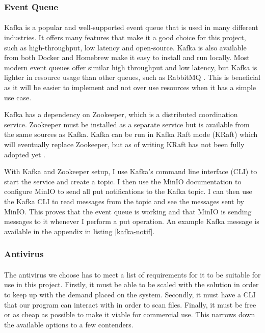 \documentclass[12pt, conference, final, a4paper, onecolumn, compsoc]{IEEEtran}
\begin{document}
\subsubsection*{Event Queue}
\paragraph{}

Kafka is a popular and well-supported event queue that is used in many different
industries. It offers many features that make it a good choice for this project,
such as high-throughput, low latency and open-source. Kafka is also available
from both Docker and Homebrew make it easy to install and run locally. Most
modern event queues offer similar high throughput and low latency, but Kafka is
lighter in resource usage than other queues, such as RabbitMQ
\citep{kafka-rabbitmq}. This is beneficial as it will be easier to implement and
not over use resources when it has a simple use case.

Kafka has a dependency on Zookeeper, which is a distributed coordination
service. Zookeeper must be installed as a separate service but is available from
the same sources as Kafka. Kafka can be run in Kafka Raft mode (KRaft) which
will eventually replace Zookeeper, but as of writing KRaft has not been fully
adopted yet \citep{kafka-raft}.

With Kafka and Zookeeper setup, I use Kafka's command line interface (CLI) to
start the service and create a topic. I then use the MinIO documentation to
configure MinIO to send all put notifications to the Kafka topic. I can then use
the Kafka CLI to read messages from the topic and see the messages sent by
MinIO. This proves that the event queue is working and that MinIO is sending
messages to it whenever I perform a put operation. An example Kafka message is
available in the appendix in listing \ref{kafka-notif}.


\subsubsection*{Antivirus}
\paragraph{}

The antivirus we choose has to meet a list of requirements for it to be suitable
for use in this project. Firstly, it must be able to be scaled with the solution
in order to keep up with the demand placed on the system. Secondly, it must have
a CLI that our program can interact with in order to scan files. Finally, it
must be free or as cheap as possible to make it viable for commercial use. This
narrows down the available options to a few contenders.
\end{document}
